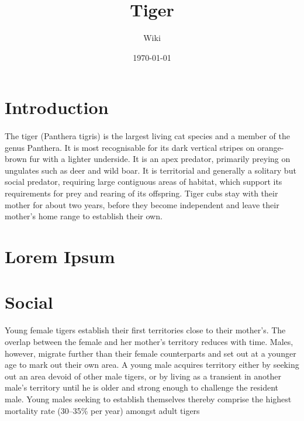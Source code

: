 \documentclass[12pt]{article}
\title{Tiger}
\author{Wiki}
\date{\today}
\begin{document}
	\maketitle
	\tableofcontents
	
	\pagebreak
	
	\section{Introduction}
	\paragraph{}
	
	The tiger  (Panthera tigris)  is the largest living cat species and a member of the genus Panthera. It is most recognisable for its dark vertical stripes on orange-brown fur with a lighter underside. It is an apex predator, primarily preying on ungulates such as deer and wild boar. It is territorial and generally a solitary but social predator, requiring large contiguous areas of habitat, which support its requirements for prey and rearing of its offspring. Tiger cubs stay with their mother for about two years, before they become independent and leave their mother's home range to establish their own.
	
	\section{Lorem Ipsum}
	\lipsum[1-4] 
	
	
	\lipsum[1-4]
	
	\section{Social}
	Young female tigers establish their first territories close to their mother's. The overlap between the female and her mother's territory reduces with time. Males, however, migrate further than their female counterparts and set out at a younger age to mark out their own area. A young male acquires territory either by seeking out an area devoid of other male tigers, or by living as a transient in another male's territory until he is older and strong enough to challenge the resident male. Young males seeking to establish themselves thereby comprise the highest mortality rate (30–35\% per year) amongst adult tigers
	
	\printindex
\end{document}
